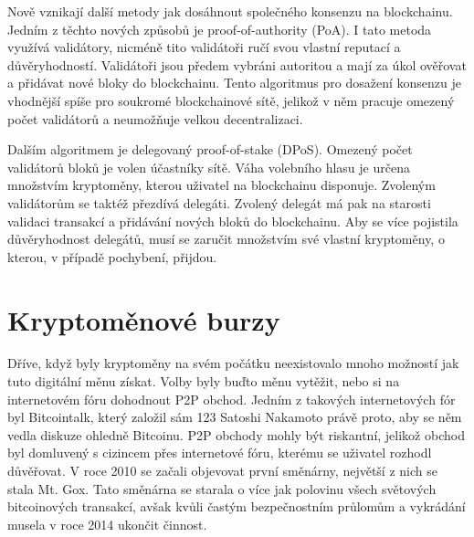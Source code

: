 Nově vznikají další metody jak dosáhnout společného konsenzu na blockchainu. Jedním z těchto nových způsobů je proof-of-authority (PoA). I tato
metoda využívá validátory, nicméně tito validátoři ručí svou vlastní reputací a důvěryhodností. Validátoři jsou předem vybráni autoritou a mají
za úkol ověřovat a přidávat nové bloky do blockchainu. Tento algoritmus pro dosažení konsenzu je vhodnější spíše pro soukromé blockchainové sítě,
jelikož v něm pracuje omezený počet validátorů a neumožňuje velkou decentralizaci.

Dalším algoritmem je delegovaný proof-of-stake (DPoS). Omezený počet validátorů bloků je volen účastníky sítě. Váha volebního hlasu
je určena množstvím kryptoměny, kterou uživatel na blockchainu disponuje. Zvoleným validátorům se taktéž přezdívá delegáti. Zvolený delegát má pak
na starosti validaci transakcí a přidávání nových bloků do blockchainu. Aby se více pojistila důvěryhodnost delegátů, musí se zaručit množstvím
své vlastní kryptoměny, o kterou, v případě pochybení, přijdou.


\section{Kryptoměnové burzy}
\label{sec:Exchanges}
Dříve, když byly kryptoměny na svém počátku neexistovalo mnoho možností jak tuto digitální měnu získat. Volby byly buďto měnu vytěžit, nebo
si na internetovém fóru dohodnout P2P obchod. Jedním z takových internetových fór byl Bitcointalk, který založil sám 123 Satoshi Nakamoto právě proto,
aby se něm vedla diskuze ohledně Bitcoinu. P2P obchody mohly být riskantní, jelikož obchod byl domluvený s cizincem přes internetové fóru, kterému
se uživatel rozhodl důvěřovat. V roce 2010 se začali objevovat první směnárny, největší z nich se stala Mt. Gox. Tato směnárna se starala o více jak polovinu
všech světových bitcoinových transakcí, avšak kvůli častým bezpečnostním průlomům a vykrádání musela v roce 2014 ukončit činnost.

